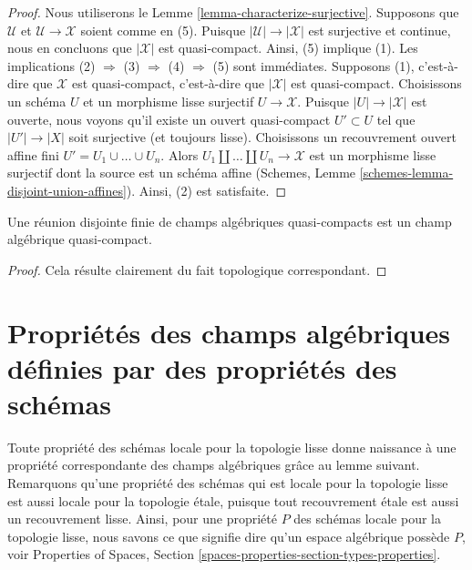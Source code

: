 \begin{proof}
Nous utiliserons le
Lemme \ref{lemma-characterize-surjective}.
Supposons que $\mathcal{U}$ et $\mathcal{U} \to \mathcal{X}$ soient comme en (5).
Puisque $|\mathcal{U}| \to |\mathcal{X}|$ est surjective et
continue, nous en concluons que $|\mathcal{X}|$ est quasi-compact.
Ainsi, (5) implique (1). Les implications
(2) $\Rightarrow$ (3) $\Rightarrow$ (4) $\Rightarrow$ (5)
sont immédiates. Supposons (1), c'est-à-dire que $\mathcal{X}$ est quasi-compact, c'est-à-dire que
$|\mathcal{X}|$ est quasi-compact. Choisissons un schéma $U$ et un morphisme lisse
surjectif $U \to \mathcal{X}$. Puisque $|U| \to |\mathcal{X}|$
est ouverte, nous voyons qu'il existe un ouvert quasi-compact $U' \subset U$
tel que $|U'| \to |X|$ soit surjective (et toujours lisse).
Choisissons un recouvrement ouvert affine fini $U' = U_1 \cup \ldots \cup U_n$.
Alors $U_1 \amalg \ldots \amalg U_n \to \mathcal{X}$
est un morphisme lisse surjectif dont la source est un
schéma affine (Schemes, Lemme \ref{schemes-lemma-disjoint-union-affines}).
Ainsi, (2) est satisfaite.
\end{proof}

\begin{lemma}
\label{lemma-finite-disjoint-quasi-compact}
Une réunion disjointe finie de champs algébriques quasi-compacts est
un champ algébrique quasi-compact.
\end{lemma}

\begin{proof}
Cela résulte clairement du fait topologique correspondant.
\end{proof}


\section{Propriétés des champs algébriques définies par des propriétés des schémas}
\label{section-types-properties}

\noindent
Toute propriété des schémas locale pour la topologie lisse donne naissance à une
propriété correspondante des champs algébriques grâce au lemme suivant. Remarquons qu'une
propriété des schémas qui est locale pour la topologie lisse est aussi locale pour la topologie \'etale,
puisque tout recouvrement \'etale est aussi un recouvrement lisse. Ainsi, pour une propriété $P$
des schémas locale pour la topologie lisse, nous savons ce que signifie dire qu'un
espace algébrique possède $P$, voir
Properties of Spaces, Section \ref{spaces-properties-section-types-properties}.

